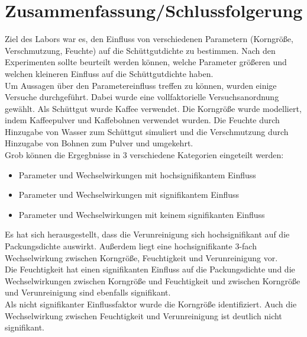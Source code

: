 \chapter{Zusammenfassung/Schlussfolgerung}
\label{sec: Zusammenfassung}

\noindent
Ziel des Labors war es, den Einfluss von verschiedenen Parametern (Korngröße,
Verschmutzung, Feuchte) auf die Schüttgutdichte zu bestimmen.
Nach den Experimenten sollte beurteilt werden können, welche Parameter größeren und
welchen kleineren Einfluss auf die Schüttgutdichte haben.
\\

\noindent
Um Aussagen über den Parametereinfluss treffen zu können, wurden einige Versuche
durchgeführt. Dabei wurde eine vollfaktorielle Versuchsanordnung gewählt. Als
Schüttgut wurde Kaffee verwendet.
Die Korngröße wurde modelliert, indem Kaffeepulver und Kaffebohnen verwendet wurden.
Die Feuchte durch Hinzugabe von Wasser zum Schüttgut simuliert und die Verschmutzung
durch Hinzugabe von Bohnen zum Pulver und umgekehrt.
\\

\noindent
Grob können die Ergegbnisse in 3 verschiedene Kategorien eingeteilt werden:
	\begin{itemize}
		\item Parameter und Wechselwirkungen mit hochsignifikantem Einfluss
		\item Parameter und Wechselwirkungen mit signifikantem Einfluss
		\item Parameter und Wechselwirkungen mit keinem signifikanten Einfluss
	\end{itemize}

\noindent
Es hat sich herausgestellt, dass die Verunreinigung sich hochsignifikant auf die
Packungsdichte auswirkt. Außerdem liegt eine hochsignifikante 3-fach Wechselwirkung
zwischen Korngröße, Feuchtigkeit und Verunreinigung vor.
\\

\noindent
Die Feuchtigkeit hat einen signifikanten Einfluss auf die Packungsdichte und die
Wechselwirkungen zwischen Korngröße und Feuchtigkeit und zwischen Korngröße und
Verunreinigung sind ebenfalls signifikant.
\\

\noindent
Als nicht signifikanter Einflussfaktor wurde die Korngröße identifiziert.
Auch die Wechselwirkung zwischen Feuchtigkeit und Verunreinigung 
ist deutlich nicht signifikant.
